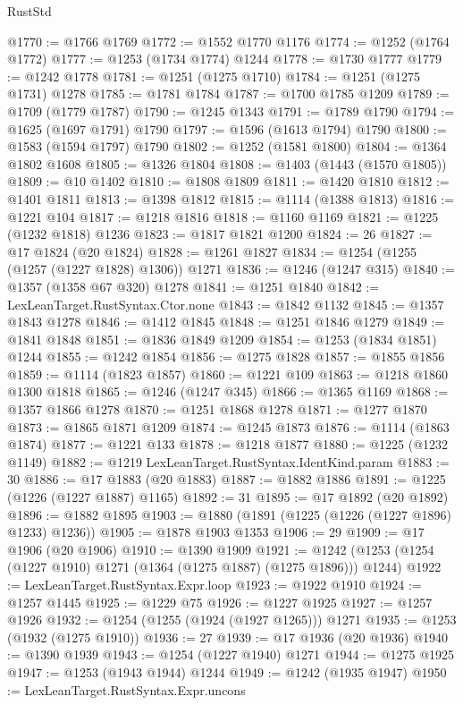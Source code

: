 \begin{lexlean}{RustStd}
\begin{coremodule}
@1770 := @1766 @1769
@1772 := @1552 @1770 @1176
@1774 := @1252 (@1764 @1772)
@1777 := @1253 (@1734 @1774) @1244
@1778 := @1730 @1777
@1779 := @1242 @1778
@1781 := @1251 (@1275 @1710)
@1784 := @1251 (@1275 @1731) @1278
@1785 := @1781 @1784
@1787 := @1700 @1785 @1209
@1789 := @1709 (@1779 @1787)
@1790 := @1245 @1343
@1791 := @1789 @1790
@1794 := @1625 (@1697 @1791) @1790
@1797 := @1596 (@1613 @1794) @1790
@1800 := @1583 (@1594 @1797) @1790
@1802 := @1252 (@1581 @1800)
@1804 := @1364 @1802 @1608
@1805 := @1326 @1804
@1808 := @1403 (@1443 (@1570 @1805))
@1809 := @10 @1402
@1810 := @1808 @1809
@1811 := @1420 @1810
@1812 := @1401 @1811
@1813 := @1398 @1812
@1815 := @1114 (@1388 @1813)
@1816 := @1221 @104
@1817 := @1218 @1816
@1818 := @1160 @1169
@1821 := @1225 (@1232 @1818) @1236
@1823 := @1817 @1821 @1200
@1824 := 26
@1827 := @17 @1824 (@20 @1824)
@1828 := @1261 @1827
@1834 := @1254 (@1255 (@1257 (@1227 @1828) @1306)) @1271
@1836 := @1246 (@1247 @315)
@1840 := @1357 (@1358 @67 @320) @1278
@1841 := @1251 @1840
@1842 := LexLeanTarget.RustSyntax.Ctor.none
@1843 := @1842 @1132
@1845 := @1357 @1843 @1278
@1846 := @1412 @1845
@1848 := @1251 @1846 @1279
@1849 := @1841 @1848
@1851 := @1836 @1849 @1209
@1854 := @1253 (@1834 @1851) @1244
@1855 := @1242 @1854
@1856 := @1275 @1828
@1857 := @1855 @1856
@1859 := @1114 (@1823 @1857)
@1860 := @1221 @109
@1863 := @1218 @1860 @1300 @1818
@1865 := @1246 (@1247 @345)
@1866 := @1365 @1169
@1868 := @1357 @1866 @1278
@1870 := @1251 @1868 @1278
@1871 := @1277 @1870
@1873 := @1865 @1871 @1209
@1874 := @1245 @1873
@1876 := @1114 (@1863 @1874)
@1877 := @1221 @133
@1878 := @1218 @1877
@1880 := @1225 (@1232 @1149)
@1882 := @1219 LexLeanTarget.RustSyntax.IdentKind.param
@1883 := 30
@1886 := @17 @1883 (@20 @1883)
@1887 := @1882 @1886
@1891 := @1225 (@1226 (@1227 @1887) @1165)
@1892 := 31
@1895 := @17 @1892 (@20 @1892)
@1896 := @1882 @1895
@1903 := @1880 (@1891 (@1225 (@1226 (@1227 @1896) @1233) @1236))
@1905 := @1878 @1903 @1353
@1906 := 29
@1909 := @17 @1906 (@20 @1906)
@1910 := @1390 @1909
@1921 := @1242 (@1253 (@1254 (@1227 @1910) @1271 (@1364 (@1275 @1887) (@1275 @1896))) @1244)
@1922 := LexLeanTarget.RustSyntax.Expr.loop
@1923 := @1922 @1910
@1924 := @1257 @1445
@1925 := @1229 @75
@1926 := @1227 @1925
@1927 := @1257 @1926
@1932 := @1254 (@1255 (@1924 (@1927 @1265))) @1271
@1935 := @1253 (@1932 (@1275 @1910))
@1936 := 27
@1939 := @17 @1936 (@20 @1936)
@1940 := @1390 @1939
@1943 := @1254 (@1227 @1940) @1271
@1944 := @1275 @1925
@1947 := @1253 (@1943 @1944) @1244
@1949 := @1242 (@1935 @1947)
@1950 := LexLeanTarget.RustSyntax.Expr.uncons

\end{coremodule}
\end{lexlean}

